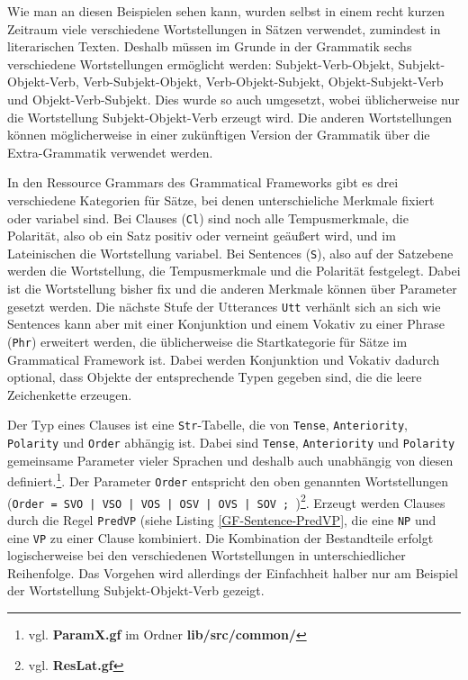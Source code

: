 Wie man an diesen Beispielen sehen kann, wurden selbst in einem recht kurzen Zeitraum viele verschiedene Wortstellungen in Sätzen verwendet, zumindest in literarischen Texten. Deshalb müssen im Grunde in der Grammatik sechs verschiedene Wortstellungen ermöglicht werden: Subjekt-Verb-Objekt, Subjekt-Objekt-Verb, Verb-Subjekt-Objekt, Verb-Objekt-Subjekt, Objekt-Subjekt-Verb und Objekt-Verb-Subjekt. Dies wurde so auch umgesetzt, wobei üblicherweise nur die Wortstellung Subjekt-Objekt-Verb erzeugt wird. Die anderen Wortstellungen können möglicherweise in einer zukünftigen Version der Grammatik über die Extra-Grammatik verwendet werden.\par
In den Ressource Grammars des Grammatical Frameworks gibt es drei verschiedene Kategorien für Sätze, bei denen unterschieliche Merkmale fixiert oder variabel sind. Bei Clauses (\texttt{Cl}) sind noch alle Tempusmerkmale, die Polarität, also ob ein Satz positiv oder verneint geäußert wird, und im Lateinischen die Wortstellung variabel. Bei Sentences (\texttt{S}), also auf der Satzebene werden die Wortstellung, die Tempusmerkmale und die Polarität festgelegt. Dabei ist die Wortstellung bisher fix und die anderen Merkmale können über Parameter gesetzt werden. Die nächste Stufe der Utterances \texttt{Utt} verhänlt sich an sich wie Sentences kann aber mit einer Konjunktion und einem Vokativ zu einer Phrase (\texttt{Phr}) erweitert werden, die üblicherweise die Startkategorie für Sätze im Grammatical Framework ist. Dabei werden Konjunktion und Vokativ dadurch optional, dass Objekte der entsprechende Typen gegeben sind, die die leere Zeichenkette erzeugen. \par
Der Typ eines Clauses ist eine \texttt{Str}-Tabelle, die von \texttt{Tense}, \texttt{Anteriority}, \texttt{Polarity} und \texttt{Order} abhängig ist. Dabei sind \texttt{Tense}, \texttt{Anteriority} und \texttt{Polarity} gemeinsame Parameter vieler Sprachen und deshalb auch unabhängig von diesen definiert.\footnote{vgl. \textbf{ParamX.gf} im Ordner \textbf{lib/src/common/}}. Der Parameter \texttt{Order} entspricht den oben genannten Wortstellungen (\texttt{Order = SVO | VSO | VOS | OSV | OVS | SOV ; })\footnote{vgl. \textbf{ResLat.gf}}. Erzeugt werden Clauses durch die Regel \texttt{PredVP} (siehe Listing \ref{GF-Sentence-PredVP}, die eine \texttt{NP} und eine \texttt{VP} zu einer Clause kombiniert. Die Kombination der Bestandteile erfolgt logischerweise bei den verschiedenen Wortstellungen in unterschiedlicher Reihenfolge. Das Vorgehen wird allerdings der Einfachheit halber nur am Beispiel der Wortstellung Subjekt-Objekt-Verb gezeigt. \par
